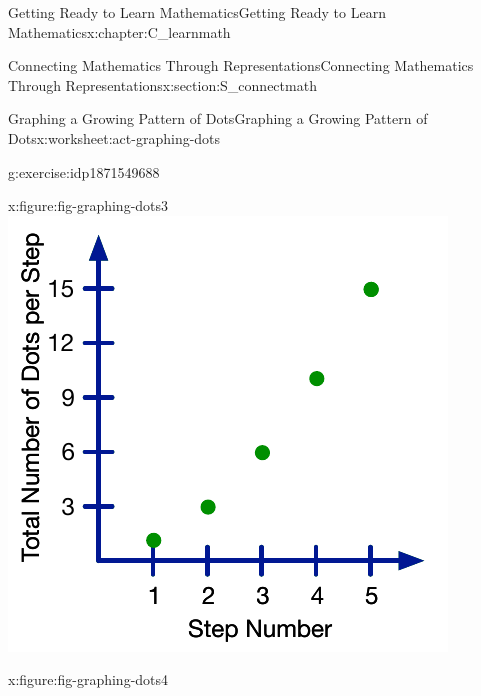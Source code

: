 \documentclass[oneside,10pt,]{book}
\numberwithin{equation}{chapter}
\begin{document}
\begin{chapterptx}{Getting Ready to Learn Mathematics}{}{Getting Ready to Learn Mathematics}{}{}{x:chapter:C_learnmath}
\begin{sectionptx}{Connecting Mathematics Through Representations}{}{Connecting Mathematics Through Representations}{}{}{x:section:S_connectmath}
\begin{worksheet-subsection}{Graphing a Growing Pattern of Dots}{}{Graphing a Growing Pattern of Dots}{}{}{x:worksheet:act-graphing-dots}
\begin{divisionexercise}{1}{}{}{g:exercise:idp1871549688}
\begin{sidebyside}{4}{0}{0}{0}
\begin{sbspanel}{0.25}
\begin{figureptx}{}{x:figure:fig-graphing-dots3}{}
\includegraphics[width=\linewidth]{external/graphing-dots3.pdf}
\tcblower
\end{figureptx}%
\end{sbspanel}%
\begin{sbspanel}{0.25}%
\begin{figureptx}{}{x:figure:fig-graphing-dots4}{}%

\end{figureptx}
\end{sbspanel}
\end{sidebyside}
\end{divisionexercise}
\end{worksheet-subsection}
\end{sectionptx}
\end{chapterptx}
\end{document}
